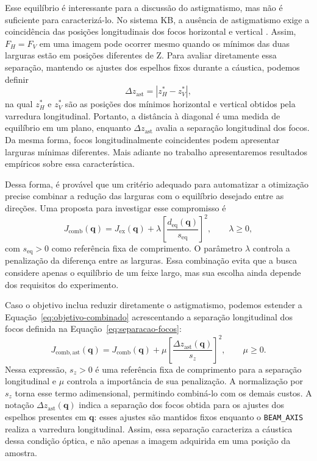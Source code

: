 \documentclass[12pt,a4paper]{article}
\begin{document}
Esse equilíbrio é interessante para a discussão do astigmatismo, mas não é suficiente para caracterizá-lo. No sistema KB, a ausência de astigmatismo exige a coincidência das posições longitudinais dos focos horizontal e vertical \cite{osterhoff2019foco}. Assim, $F_H=F_V$ em uma imagem pode ocorrer mesmo quando os mínimos das duas larguras estão em posições diferentes de Z. Para avaliar diretamente essa separação, mantendo os ajustes dos espelhos fixos durante a cáustica, podemos definir
\begin{equation}
    \Delta z_{\mathrm{ast}}=|z_H^{*}-z_V^{*}|,
    \label{eq:separacao-focos}
\end{equation}
na qual $z_H^{*}$ e $z_V^{*}$ são as posições dos mínimos horizontal e vertical obtidos pela varredura longitudinal. Portanto, a distância à diagonal é uma medida de equilíbrio em um plano, enquanto $\Delta z_{\mathrm{ast}}$ avalia a separação longitudinal dos focos. Da mesma forma, focos longitudinalmente coincidentes podem apresentar larguras mínimas diferentes. Mais adiante no trabalho apresentaremos resultados empíricos sobre essa característica.

Dessa forma, é provável que um critério adequado para automatizar a otimização precise combinar a redução das larguras com o equilíbrio desejado entre as direções. Uma proposta para investigar esse compromisso é
\begin{equation}
    J_{\mathrm{comb}}(\mathbf{q})=J_{\mathrm{ex}}(\mathbf{q})+
    \lambda\left[\frac{d_{\mathrm{eq}}(\mathbf{q})}{s_{\mathrm{eq}}}\right]^2,
    \qquad \lambda\geq 0,
    \label{eq:objetivo-combinado}
\end{equation}
com $s_{\mathrm{eq}}>0$ como referência fixa de comprimento. O parâmetro $\lambda$ controla a penalização da diferença entre as larguras. Essa combinação evita que a busca considere apenas o equilíbrio de um feixe largo, mas sua escolha ainda depende dos requisitos do experimento.

Caso o objetivo inclua reduzir diretamente o astigmatismo, podemos estender a Equação~\ref{eq:objetivo-combinado} acrescentando a separação longitudinal dos focos definida na Equação~\ref{eq:separacao-focos}:
\begin{equation}
    J_{\mathrm{comb,ast}}(\mathbf{q})=
    J_{\mathrm{comb}}(\mathbf{q})+
    \mu\left[\frac{\Delta z_{\mathrm{ast}}(\mathbf{q})}{s_z}\right]^2,
    \qquad \mu\geq 0.
    \label{eq:objetivo-combinado-astigmatismo}
\end{equation}
Nessa expressão, $s_z>0$ é uma referência fixa de comprimento para a separação longitudinal e $\mu$ controla a importância de sua penalização. A normalização por $s_z$ torna esse termo adimensional, permitindo combiná-lo com os demais custos. A notação $\Delta z_{\mathrm{ast}}(\mathbf{q})$ indica a separação dos focos obtida para os ajustes dos espelhos presentes em $\mathbf{q}$: esses ajustes são mantidos fixos enquanto o \texttt{BEAM\_AXIS} realiza a varredura longitudinal. Assim, essa separação caracteriza a cáustica dessa condição óptica, e não apenas a imagem adquirida em uma posição da amostra.
\end{document}
